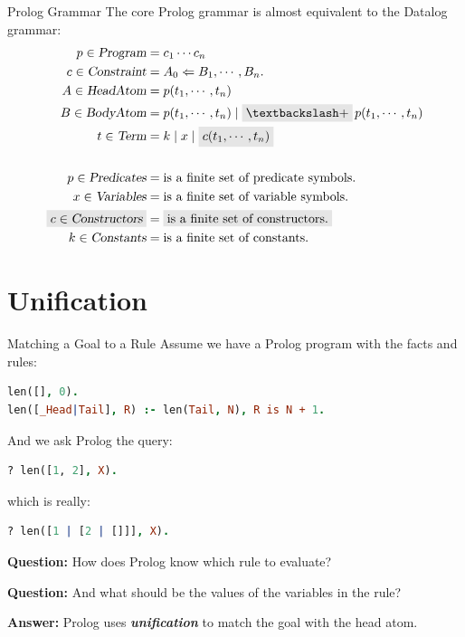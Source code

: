 \begin{frame}{Prolog Grammar}
The core Prolog grammar is almost equivalent to the Datalog grammar:
{
\large
\begin{align*}
p \in \textsl{Program}      &= c_1 \cdots c_n \\
c \in \textsl{Constraint}   &= A_0 \Leftarrow B_1, \cdots, B_n. \\ 
A \in \textsl{HeadAtom}     &= p(t_1, \cdots, t_n) \\
B \in \textsl{BodyAtom}     &= p(t_1, \cdots, t_n) \mid \Highlight{\textbackslash+} \, p(t_1, \cdots, t_n) \\
t \in \textsl{Term}         &= k \mid x \mid \Highlight{c (t_1, \cdots, t_n)} \\
\\
p \in \textsl{Predicates}   & = \text{is a finite set of predicate symbols.} \\
x \in \textsl{Variables}    & = \text{is a finite set of variable symbols.} \\
\Highlight{c \in \textsl{Constructors}} & = \Highlight{\text{is a finite set of constructors.}} \\
k \in \textsl{Constants}    & = \text{is a finite set of constants.}
\end{align*}
}
\end{frame}

\section{Unification}

\begin{frame}[fragile]{Matching a Goal to a Rule}
Assume we have a Prolog program with the facts and rules:

\begin{lstlisting}[language=prolog, xleftmargin=0.5cm]
len([], 0).
len([_Head|Tail], R) :- len(Tail, N), R is N + 1.
\end{lstlisting}

\pause 

And we ask Prolog the query:

\begin{lstlisting}[language=prolog, xleftmargin=0.5cm]
? len([1, 2], X).
\end{lstlisting}

which is really: 

\begin{lstlisting}[language=prolog, xleftmargin=0.5cm]
? len([1 | [2 | []]], X).
\end{lstlisting}

\textbf{Question:} How does Prolog know which rule to evaluate?

\textbf{Question:} And what should be the values of the variables in the rule?

\pause 

\textbf{Answer:} Prolog uses \textbf{\emph{unification}} to match the goal with
the head atom.
\end{frame}   


